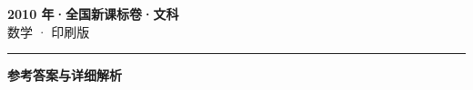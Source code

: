 \documentclass[zihao=5, a4paper]{ctexart}
\begin{document}
\begin{center}
  {\Large\bfseries 2010 年·全国新课标卷·文科}\\[4pt]
  {\large 数学 · 印刷版}
\end{center}
\medskip
{}

\par\bigskip\hrule\bigskip
{}
\begin{center}{\large\bfseries 参考答案与详细解析}\end{center}
\smallskip

\end{document}
